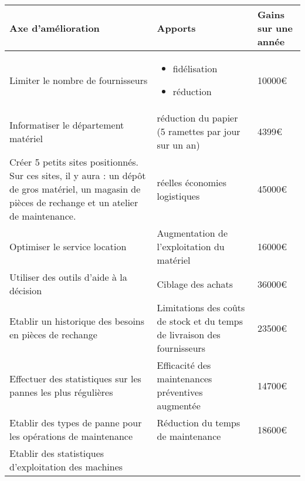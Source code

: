     \begin{tabular}{|p{7cm}|p{5cm}|p{2cm}|}    \hline
Axe d'amélioration & Apports & Gains sur une année\\ \hline
Limiter le nombre de fournisseurs 
                                  & \begin{itemize}
                                      \item fidélisation
                                      \item réduction
                                     \end{itemize}
                                                          & 10000€  \\ \cline{1-2}
Informatiser le département matériel 
                                  & réduction du papier (5 ramettes par jour sur un an)
                                                          & 4399€  \\ \cline{1-2}
Créer 5 petits sites positionnés. Sur ces sites, il y aura : un dépôt de gros matériel, un magasin de
pièces de rechange et un atelier de maintenance. 
                                  & réelles économies logistiques
                                                          & 45000€  \\ \cline{1-2}
Optimiser le service location 
                                  & Augmentation de l'exploitation du matériel
                                                          &  16000€ \\ \cline{1-2}  
Utiliser des outils d'aide à la décision
                                  & Ciblage des achats
                                                          &  36000€ \\ \cline{1-2} 
Etablir un historique des besoins en pièces de rechange
                                  & Limitations des coûts de stock et du temps de livraison des fournisseurs
                                                          &  23500€ \\ \cline{1-2} 
Effectuer des statistiques sur les pannes les plus régulières
                                  & Efficacité des maintenances préventives augmentée
                                                          &   14700€\\ \cline{1-2}         
Etablir des types de panne pour les opérations de maintenance
                                  & Réduction du temps de maintenance
                                                          &   18600€\\ \cline{1-2}
Etablir des statistiques d'exploitation des machines

\end{tabular}
